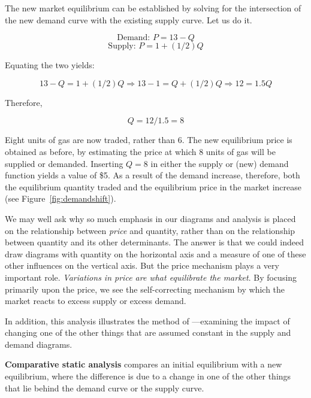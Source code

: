 The new market equilibrium can be established by solving for the intersection of the new demand curve with the existing supply curve. Let us do it.

\begin{equation*}
\text{Demand: }P=13-Q
\end{equation*}
\begin{equation*}
\text{Supply: }P=1+(1/2)Q
\end{equation*}

Equating the two yields:

\begin{equation*}
13-Q=1+(1/2)Q\Rightarrow 13-1=Q+(1/2)Q\Rightarrow 12=1.5Q
\end{equation*}

Therefore,

\begin{equation*}
Q=12/1.5=8
\end{equation*}

Eight units of gas are now traded, rather than 6. The new equilibrium price is obtained as before, by estimating the price at which 8 units of gas will be supplied or demanded. Inserting $Q=8$ in either the supply or (new) demand function yields a value of \$5. As a result of the demand increase, therefore, both the equilibrium quantity traded and the equilibrium price in the market increase (see Figure~\ref{fig:demandshift}).

We may well ask why so much emphasis in our diagrams and analysis is placed on the relationship between \textit{price} and quantity, rather than on the relationship between quantity and its other determinants. The answer is that we could indeed draw diagrams with quantity on the horizontal axis and a measure of one of these other influences on the vertical axis. But the price mechanism plays a very important role. \textit{Variations in price are what equilibrate the market}. By focusing primarily upon the price, we see the self-correcting mechanism by which the market reacts to excess supply or excess demand.

In addition, this analysis illustrates the method of ---examining the impact of changing one of the other things that are assumed constant in the supply and demand diagrams.

\begin{DefBox}
\textbf{Comparative static analysis} compares an initial equilibrium with a new equilibrium, where the difference is due to a change in one of the other things that lie behind the demand curve or the supply curve.
\end{DefBox}

